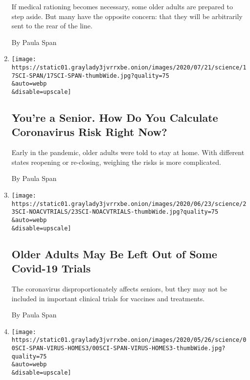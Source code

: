 \begin{enumerate}
  If medical rationing becomes necessary, some older adults are prepared
  to step aside. But many have the opposite concern: that they will be
  arbitrarily sent to the rear of the line.

  By Paula Span
\item
  \href{/2020/07/17/health/seniors-coronavirus-reopenings.html}{}

  \texttt{[image: https://static01.graylady3jvrrxbe.onion/images/2020/07/21/science/17SCI-SPAN/17SCI-SPAN-thumbWide.jpg?quality=75\\\&auto=webp\\\&disable=upscale]}

  \hypertarget{youre-a-senior-how-do-you-calculate-coronavirus-risk-right-now}{%
  \subsection{You're a Senior. How Do You Calculate Coronavirus Risk
  Right
  Now?}\label{youre-a-senior-how-do-you-calculate-coronavirus-risk-right-now}}

  Early in the pandemic, older adults were told to stay at home. With
  different states reopening or re-closing, weighing the risks is more
  complicated.

  By Paula Span
\item
  \href{/2020/06/19/health/vaccine-trials-elderly.html}{}

  \texttt{[image: https://static01.graylady3jvrrxbe.onion/images/2020/06/23/science/23SCI-NOACVTRIALS/23SCI-NOACVTRIALS-thumbWide.jpg?quality=75\\\&auto=webp\\\&disable=upscale]}

  \hypertarget{older-adults-may-be-left-out-of-some-covid-19-trials}{%
  \subsection{Older Adults May Be Left Out of Some Covid-19
  Trials}\label{older-adults-may-be-left-out-of-some-covid-19-trials}}

  The coronavirus disproportionately affects seniors, but they may not
  be included in important clinical trials for vaccines and treatments.

  By Paula Span
\item
  \href{/2020/05/22/health/coronavirus-nursing-homes.html}{}

  \texttt{[image: https://static01.graylady3jvrrxbe.onion/images/2020/05/26/science/00SCI-SPAN-VIRUS-HOMES3/00SCI-SPAN-VIRUS-HOMES3-thumbWide.jpg?quality=75\\\&auto=webp\\\&disable=upscale]}

  \hypertarget{how-to-improve-and-protect-nursing-homes-from-outbreaks}{%
}
\end{enumerate}
